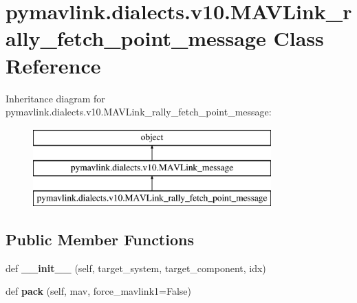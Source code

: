 \hypertarget{classpymavlink_1_1dialects_1_1v10_1_1MAVLink__rally__fetch__point__message}{}\section{pymavlink.\+dialects.\+v10.\+M\+A\+V\+Link\+\_\+rally\+\_\+fetch\+\_\+point\+\_\+message Class Reference}
\label{classpymavlink_1_1dialects_1_1v10_1_1MAVLink__rally__fetch__point__message}
Inheritance diagram for pymavlink.\+dialects.\+v10.\+M\+A\+V\+Link\+\_\+rally\+\_\+fetch\+\_\+point\+\_\+message\+:\begin{figure}[H]
\begin{center}
\leavevmode
\includegraphics[height=3.000000cm]{classpymavlink_1_1dialects_1_1v10_1_1MAVLink__rally__fetch__point__message}
\end{center}
\end{figure}
\subsection*{Public Member Functions}
\begin{DoxyCompactItemize}
\item 
\mbox{\label{classpymavlink_1_1dialects_1_1v10_1_1MAVLink__rally__fetch__point__message_a2cd03ff76de70198fe8bf7426e7a6523}} 
def {\bfseries \+\_\+\+\_\+init\+\_\+\+\_\+} (self, target\+\_\+system, target\+\_\+component, idx)
\item 
\mbox{\label{classpymavlink_1_1dialects_1_1v10_1_1MAVLink__rally__fetch__point__message_a483d77559a09e226ffa6893aafd7357e}} 
def {\bfseries pack} (self, mav, force\+\_\+mavlink1=False)
\end{DoxyCompactItemize}
